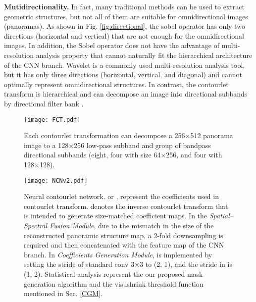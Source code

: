 \documentclass[10pt,times,mathptm,psfig,twocolumn,journals]{IEEEtran}
\begin{document}
\textbf{Mutidirectionality.}
In fact, many traditional methods can be used to extract geometric structures, but not all of them are suitable for omnidirectional images (panoramas). As shown in Fig. \ref{fig:directional}, the sobel operator has only two directions (horizontal and vertical) that are not enough for the omnidirectional images. In addition, the Sobel operator does not have the advantage of multi-resolution analysis property that cannot naturally fit the hierarchical architecture of the CNN branch. Wavelet is a commonly used multi-resolution analysis tool, but it has only three directions (horizontal, vertical, and diagonal) and cannot optimally represent omnidirectional structures. In contrast, the contourlet transform is hierarchical and can decompose an image into  directional subbands by directional filter bank \cite{MengkunLiu2021CCNNCC}.
\begin{figure}[t]
\centering
\texttt{[image: FCT.pdf]}
\caption{Each contourlet transformation can decompose a 256×512 panorama image to a 128×256 low-pass subband and group of bandpass directional subbands (eight, four with size 64×256, and four with 128×128).}
\label{fig:FCT}
\end{figure}
\begin{figure*}[t]
\centering
\texttt{[image: NCNv2.pdf]}
\caption{Neural contourlet network.  or , represent the coefficients used in contourlet transform.  denotes the inverse contourlet transform that is intended to generate size-matched coefficient maps. In the \textit{Spatial–Spectral Fusion Module}, due to the mismatch in the size of the reconstructed panoramic structure map, a 2-fold downsampling is required and then concatenated with the feature map of the CNN branch. In \textit{Coefficients Generation Module},  is implemented by setting the stride of standard conv 3×3 to (2, 1), and the stride in  is (1, 2). Statistical analysis represent the our proposed mask generation algorithm and the visushrink threshold function mentioned in Sec. \ref{CGM}.}
\label{fig:net}
\end{figure*}
\end{document}

